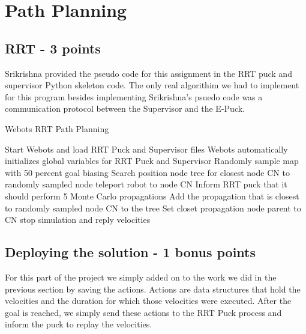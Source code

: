 \documentclass{article}
\numberwithin{equation}{section} %
\numberwithin{figure}{section} %
\numberwithin{table}{section} %
\begin{document}
\section{Path Planning}

\begin{framed}
\subsection{ RRT - 3 points}
\label{sec:RRT}

Srikrishna provided the pseudo code for this assignment in the RRT puck and supervisor Python skeleton code.  The only real algorithim we had to implement for this program besides implementing Srikrishna's psuedo code was a communication protocol between the Supervisor and the E-Puck.  

\begin{algorithm}[H]
\caption{Webots RRT Path Planning }\label{alg:cap}
\begin{algorithmic}[1] %
\State Start Webots and load RRT Puck and Supervisor files
\State Webots automatically initializes global variables for RRT Puck and Supervisor
\State Randomly sample map with 50 percent goal biasing 
\State Search position node tree for closest node CN to randomly sampled node 
\State teleport robot to node CN 
\State Inform RRT puck that it should perform 5 Monte Carlo propagations 
  \State Add the propagation that is closest to randomly sampled node CN to the tree 
  \State Set closet propagation node parent to CN 
\EndIf
{}
\State stop simulation and reply velocities
\EndIf
\EndWhile
\end{algorithmic}
\end{algorithm}

\subsection{ Deploying the solution - 1 bonus points}
\label{sec:RRT_bonus}

For this part of the project we simply added on to the work we did in the previous section by saving the actions.  Actions are data structures that hold the velocities and the duration for which those velocities were executed. After the goal is reached, we simply send these actions to the RRT Puck process and inform the puck to replay the velocities. 


\end{framed}
\end{document}
